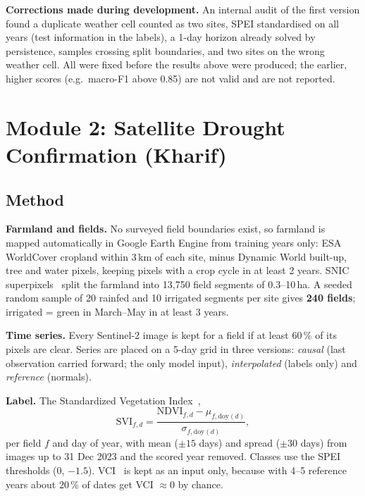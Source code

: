 \documentclass[11pt,a4paper,oneside]{article}
\newcommand{\mf}{macro-F1}
\begin{document}
\textbf{Corrections made during development.} An internal audit of the first version found a duplicate weather cell counted as two sites, SPEI standardised on all years (test information in the labels), a 1-day horizon already solved by persistence, samples crossing split boundaries, and two sites on the wrong weather cell. All were fixed before the results above were produced; the earlier, higher scores (e.g.\ \mf{} above 0.85) are not valid and are not reported.

\section{Module 2: Satellite Drought Confirmation (Kharif)}

\subsection{Method}
\textbf{Farmland and fields.} No surveyed field boundaries exist, so farmland is mapped automatically in Google Earth Engine from training years only: ESA WorldCover cropland within 3\,km of each site, minus Dynamic World built-up, tree and water pixels, keeping pixels with a crop cycle in at least 2 years. SNIC superpixels~\cite{achanta2017} split the farmland into 13,750 field segments of 0.3--10\,ha. A seeded random sample of 20 rainfed and 10 irrigated segments per site gives \textbf{240 fields}; irrigated = green in March--May in at least 3 years.

\textbf{Time series.} Every Sentinel-2 image is kept for a field if at least 60\,\% of its pixels are clear. Series are placed on a 5-day grid in three versions: \emph{causal} (last observation carried forward; the only model input), \emph{interpolated} (labels only) and \emph{reference} (normals).

\textbf{Label.} The Standardized Vegetation Index~\cite{peters2002},
\begin{equation}
\mathrm{SVI}_{f,d} = \frac{\mathrm{NDVI}_{f,d} - \mu_{f,\mathrm{doy}(d)}}{\sigma_{f,\mathrm{doy}(d)}},
\end{equation}
per field $f$ and day of year, with mean ($\pm 15$ days) and spread ($\pm 30$ days) from images up to 31 Dec 2023 and the scored year removed. Classes use the SPEI thresholds (0, $-1.5$). VCI~\cite{kogan1995} is kept as an input only, because with 4--5 reference years about 20\,\% of dates get VCI $\approx 0$ by chance.
\end{document}
